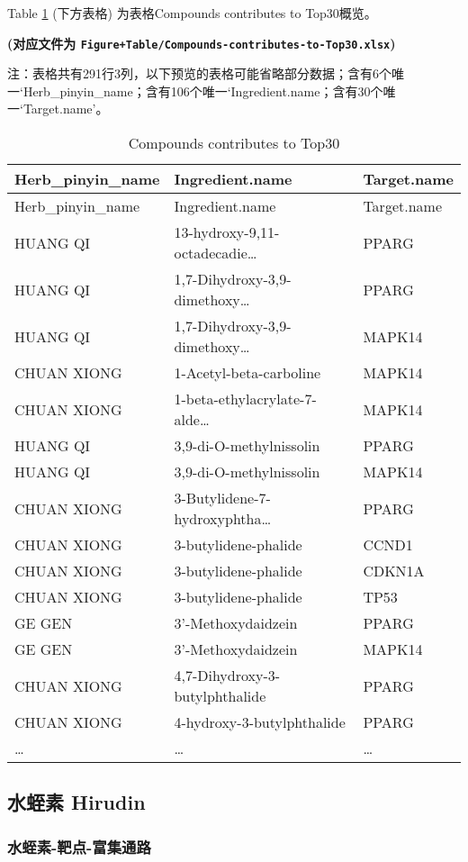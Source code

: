 \documentclass[
]{article}
\begin{document}
Table \ref{tab:Compounds-contributes-to-Top30} (下方表格) 为表格Compounds contributes to Top30概览。

\textbf{(对应文件为 \texttt{Figure+Table/Compounds-contributes-to-Top30.xlsx})}

\begin{center}\begin{tcolorbox}[colback=gray!10, colframe=gray!50, width=0.9\linewidth, arc=1mm, boxrule=0.5pt]注：表格共有291行3列，以下预览的表格可能省略部分数据；含有6个唯一`Herb\_pinyin\_name；含有106个唯一`Ingredient.name；含有30个唯一`Target.name'。
\end{tcolorbox}
\end{center}

\begin{longtable}[]{@{}lll@{}}
\caption{\label{tab:Compounds-contributes-to-Top30}Compounds contributes to Top30}\tabularnewline
\toprule
Herb\_pinyin\_name & Ingredient.name & Target.name\tabularnewline
\midrule
\endfirsthead
\toprule
Herb\_pinyin\_name & Ingredient.name & Target.name\tabularnewline
\midrule
\endhead
HUANG QI & 13-hydroxy-9,11-octadecadie\ldots{} & PPARG\tabularnewline
HUANG QI & 1,7-Dihydroxy-3,9-dimethoxy\ldots{} & PPARG\tabularnewline
HUANG QI & 1,7-Dihydroxy-3,9-dimethoxy\ldots{} & MAPK14\tabularnewline
CHUAN XIONG & 1-Acetyl-beta-carboline & MAPK14\tabularnewline
CHUAN XIONG & 1-beta-ethylacrylate-7-alde\ldots{} & MAPK14\tabularnewline
HUANG QI & 3,9-di-O-methylnissolin & PPARG\tabularnewline
HUANG QI & 3,9-di-O-methylnissolin & MAPK14\tabularnewline
CHUAN XIONG & 3-Butylidene-7-hydroxyphtha\ldots{} & PPARG\tabularnewline
CHUAN XIONG & 3-butylidene-phalide & CCND1\tabularnewline
CHUAN XIONG & 3-butylidene-phalide & CDKN1A\tabularnewline
CHUAN XIONG & 3-butylidene-phalide & TP53\tabularnewline
GE GEN & 3'-Methoxydaidzein & PPARG\tabularnewline
GE GEN & 3'-Methoxydaidzein & MAPK14\tabularnewline
CHUAN XIONG & 4,7-Dihydroxy-3-butylphthalide & PPARG\tabularnewline
CHUAN XIONG & 4-hydroxy-3-butylphthalide & PPARG\tabularnewline
\ldots{} & \ldots{} & \ldots{}\tabularnewline
\bottomrule
\end{longtable}

\hypertarget{ux6c34ux86edux7d20-hirudin}{%
\subsection{水蛭素 Hirudin}\label{ux6c34ux86edux7d20-hirudin}}

\hypertarget{ux6c34ux86edux7d20-ux9776ux70b9-ux5bccux96c6ux901aux8def}{%
\subsubsection{水蛭素-靶点-富集通路}\label{ux6c34ux86edux7d20-ux9776ux70b9-ux5bccux96c6ux901aux8def}}
\end{document}
